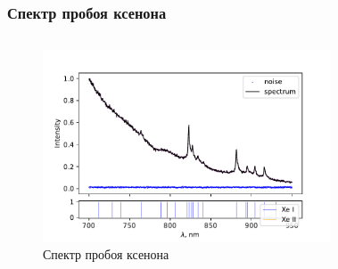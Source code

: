 \documentclass{beamer}
\begin{document}
	\begin{frame}
		\frametitle{Спектр пробоя ксенона}
		\begin{columns}
			\begin{figure}
				\centering
				\includegraphics[width=1.1\linewidth]{gen/xe_lines_spherical.pdf}
				\caption*{Спектр пробоя ксенона}
			\end{figure}	
			\begin{figure}
				\centering

\end{figure}
\end{columns}
\end{frame}
\end{document}
